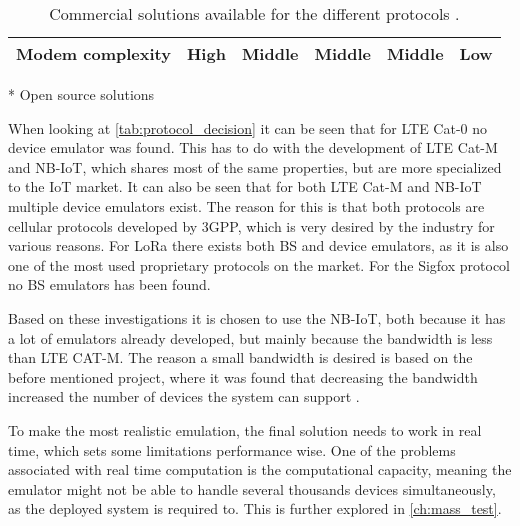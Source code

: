 \begin{table}[H]
{\begin{tabular}{|c|c|c|c|c|c|}
Modem complexity	& High 				& Middle 				& Middle 			& Middle 		& Low				\\ \hline
\end{tabular}}
\raggedright \scriptsize{ * Open source solutions} 
\caption{Commercial solutions available for the different protocols \citep{UE_list, Amarisoft_solutions, SRS_solutions, LORA_solutions, Things_solutions, Mira_solutions, Telit_solutions, telefonicaid_solutions, murata_solutions}.}%
\label{tab:protocol_decision}
\end{table}


When looking at \autoref{tab:protocol_decision} it can be seen that for \gls{LTE} Cat-0 no device emulator was found. This has to do with the development of \gls{LTE} Cat-M and \gls{NB-IoT}, which shares most of the same properties, but are more specialized to the \gls{IoT} market. It can also be seen that for both \gls{LTE} Cat-M and \gls{NB-IoT} multiple device emulators exist. The reason for this is that both protocols are cellular protocols developed by \gls{3GPP}, which is very desired by the industry for various reasons. For \gls{LoRa} there exists both  \gls{BS} and device emulators, as it is also one of the most used proprietary protocols on the market. For the Sigfox protocol no \gls{BS} emulators has been found. 

Based on these investigations it is chosen to use the \gls{NB-IoT}, both because it has a lot of emulators already developed, but mainly because the bandwidth is less than LTE CAT-M. The reason a small bandwidth is desired is based on the before mentioned project, where it was found that decreasing the bandwidth increased the number of devices the system can support \citep{thesis_report}. 


To make the most realistic emulation, the final solution needs to work in real time, which sets some limitations performance wise. One of the problems associated with real time computation is the computational capacity, meaning the emulator might not be able to handle several thousands devices simultaneously, as the deployed system is required to. This is further explored in \autoref{ch:mass_test}.

